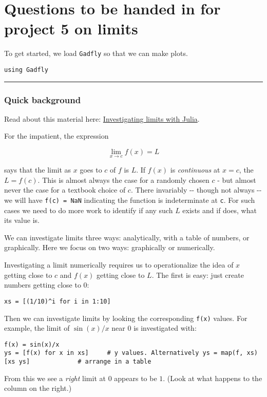 \documentclass[12pt]{article}
\begin{document}
\section{Questions to be handed in for project 5 on limits}

To get started, we load \texttt{Gadfly} so that we can make plots.



\begin{verbatim}
using Gadfly        
\end{verbatim}
\begin{center}\rule{3in}{0.4pt}\end{center}

\subsubsection{Quick background}

Read about this material here:
\href{http://mth229.github.io/limits.html}{Investigating limits with
Julia}.

For the impatient, the expression

\[
\lim_{x \rightarrow c} f(x) = L
\]

says that the limit as $x$ goes to $c$ of $f$ is $L$. If $f(x)$ is
\emph{continuous} at $x=c$, the $L=f(c)$. This is almost always the case
for a randomly chosen $c$ - but almost never the case for a textbook
choice of $c$. There invariably -{}- though not always -{}- we will have
\texttt{f(c) = NaN} indicating the function is indeterminate at
\texttt{c}. For such cases we need to do more work to identify if any
such $L$ exists and if does, what its value is.

We can investigate limits three ways: analytically, with a table of
numbers, or graphically. Here we focus on two ways: graphically or
numerically.

Investigating a limit numerically requires us to operationalize the idea
of $x$ getting close to $c$ and $f(x)$ getting close to $L$. The first
is easy: just create numbers getting close to 0:



\begin{verbatim}
xs = [(1/10)^i for i in 1:10]
\end{verbatim}
Then we can investigate limits by looking the corresponding
\texttt{f(x)} values. For example, the limit of $\sin(x)/x$ near $0$ is
investigated with:



\begin{verbatim}
f(x) = sin(x)/x
ys = [f(x) for x in xs]     # y values. Alternatively ys = map(f, xs)
[xs ys]             # arrange in a table
\end{verbatim}
From this we see a \emph{right} limit at 0 appears to be $1$. (Look at
what happens to the column on the right.)
\end{document}
